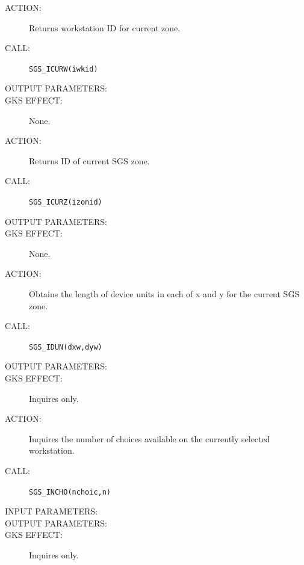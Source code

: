 \documentclass[11pt]{article}
\begin{document}
\begin{description}
\item [ACTION:]
Returns workstation ID for current zone.
\item [CALL:]
{\tt SGS\_ICURW(iwkid)}
\item [OUTPUT PARAMETERS:]
\begin{params}
\end{params}
\item [GKS EFFECT:]
None.
\end{description}
\goodbreak

\begin{description}
\item [ACTION:]
Returns ID of current SGS zone.
\item [CALL:]
{\tt SGS\_ICURZ(izonid)}
\item [OUTPUT PARAMETERS:]
\begin{params}
\end{params}
\item [GKS EFFECT:]
None.
\end{description}
\goodbreak

\begin{description}
\item [ACTION:]
Obtains the length of device units in each of x and y for the current SGS zone.
\item [CALL:]
{\tt SGS\_IDUN(dxw,dyw)}
\item [OUTPUT PARAMETERS:]
\begin{params}
\end{params}
\item [GKS EFFECT:]
Inquires only.
\end{description}
\goodbreak

\begin{description}
\item [ACTION:]
Inquires the number of choices available on the currently selected workstation.
\item [CALL:]
{\tt SGS\_INCHO(nchoic,n)}
\item [INPUT PARAMETERS:]
\begin{params}
\end{params}
\item [OUTPUT PARAMETERS:]
\begin{params}
\end{params}
\item [GKS EFFECT:]
Inquires only.
\end{description}
\goodbreak
\end{document}
